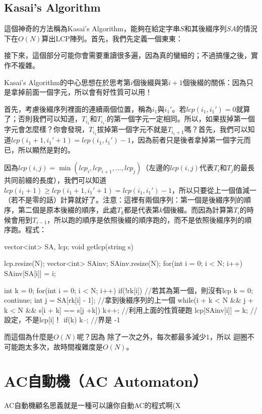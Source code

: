 		\subsection{Kasai's Algorithm}
			這個神奇的方法稱為Kasai's Algorithm，能夠在給定字串$S$和其後綴序列$SA$的情況下在$O(N)$算出LCP陣列。首先，我們先定義一個東東：
			
			接下來，這個部分可能你會需要重讀很多遍，因為真的蠻細的；不過搞懂之後，實作不複雜。
			
			Kasai's Algorithm的中心思想在於思考第$i$個後綴與第$i + 1$個後綴的關係：因為只是拿掉前面一個字元，所以會有好性質可以用！
			
			首先，考慮後綴序列裡面的連續兩個位置，稱為$i_1$與$i_1'$。若$lcp(i_1, i_1') = 0$就算了；否則我們可以知道，$T_{i_1}$和$T_{i_1'}$的第一個字元一定相同。所以，如果拔掉第一個字元會怎麼樣？你會發現，$T_{i_1}$拔掉第一個字元不就是$T_{i_1 + 1}$嗎？首先，我們可以知道$lcp(i_1 + 1, i_1' + 1) = lcp(i_1, i_1') - 1$，因為前者只是後者拿掉第一個字元而已，所以顯然是對的。
			
			因為$lcp(i, j) = \min(lcp_i, lcp_{i + 1}, \dots, lcp_{j})$（左邊的$lcp(i, j)$代表$T_i$和$T_j$的最長共同前綴的長度），我們可以知道$lcp(i_1 + 1) \geq lcp(i_1 + 1, i_1' + 1) =lcp(i_1, i_1') - 1$，所以只要從上一個值減一（若不是零的話）計算就好了。注意：這裡有兩個序列：第一個是後綴序列的順序，第二個是原本後綴的順序，此處$T_k$都是代表第$k$個後綴。而因為計算第$T_i$的時候會用到$T_{i -1 }$，所以跑的順序是依照後綴的順序跑的，而不是依照後綴序列的順序跑。程式：
			\begin{C++}
vector<int> SA, lcp;
void getlcp(string s){
	lcp.resize(N);
	vector<int> SAinv;
	SAinv.resize(N);
	for(int i = 0; i < N; i++){
		SAinv[SA[i]] = i;
	}

	int k = 0;
	for(int i = 0; i < N; i++){
		if(!rk[i]){ //若其為第一個，則沒有lcp
			k = 0;
			continue;
		}
		int j = SA[rk[i] - 1]; //拿到後綴序列的上一個
		while(i + k < N && j + k < N && s[i + k] == s[j +k])  		
			k++;  //利用上面的性質硬跑
		lcp[SAinv[i]] = k; //設定，不是lcp[i]！
		if(k) k--; //界是 -1
	}
}
			\end{C++}
		而這個為什麼是$O(N)$呢？因為 除了一次之外，每次都最多減少$1$，所以 迴圈不可能跑太多次，故時間複雜度是$O(N)$。

\section{AC自動機（AC Automaton）}
AC自動機顧名思義就是一種可以讓你自動AC的程式啊(X\\

